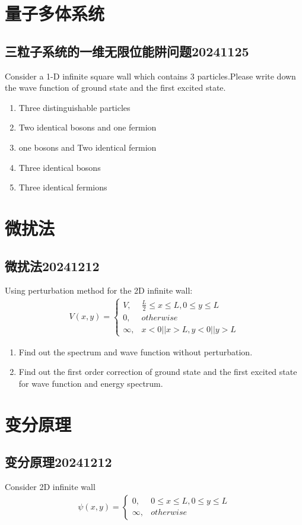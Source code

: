 \documentclass{article}
\begin{document}
\section{量子多体系统}
\subsection{三粒子系统的一维无限位能阱问题20241125}
Consider a 1-D infinite square wall which contains 3 particles.Please write down the wave function of ground state and the first excited state.
\begin{enumerate}
    \item Three distinguishable particles
    \item Two identical bosons and one fermion
    \item one bosons and Two identical fermion
    \item Three identical bosons
    \item Three identical fermions
\end{enumerate}

\section{微扰法}
\subsection{微扰法20241212}
Using perturbation method for the 2D infinite wall:
\begin{align*}
    V(x,y)=
    \begin{cases}
        V,&\frac{L}{2}\leq x \leq L,0\leq y\leq L\\
        0,&otherwise\\
        \infty,&x<0||x>L,y<0||y>L
    \end{cases}
\end{align*}
\begin{enumerate}
    \item  Find out the spectrum and wave function without perturbation.
    \item Find out the first order correction of ground state and the first excited state for wave function and energy spectrum.
\end{enumerate}

\section{变分原理}
\subsection{变分原理20241212}
Consider 2D infinite wall 
\begin{align*}
    \psi(x,y)=
    \begin{cases}
        0,&0\leq x \leq L,0\leq y\leq L\\
        \infty,&otherwise    
    \end{cases}
\end{align*}
\end{document}
